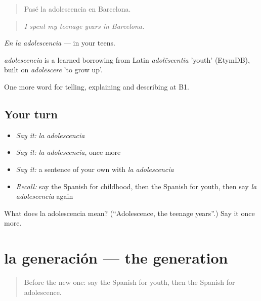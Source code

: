 \begin{quote}
Pasé la adolescencia en Barcelona.
\end{quote}

\begin{quote}
\emph{I spent my teenage years in Barcelona.}
\end{quote}

\emph{En la adolescencia} — in your teens.

\begin{cousinweb}
\emph{adolescencia} is a learned borrowing from Latin \emph{adolēscentia} 'youth' (EtymDB), built on \emph{adolēscere} 'to grow up'.
\end{cousinweb}

\begin{grammarlens}[title={What you've built}]
One more word for telling, explaining and describing at B1.
\end{grammarlens}

\subsection*{Your turn}
\begin{itemize}
\raggedright
  \item \emph{Say it:} \emph{la adolescencia}
  \item \emph{Say it:} \emph{la adolescencia}, once more
  \item \emph{Say it:} a sentence of your own with \emph{la adolescencia}
  \item \emph{Recall:} say the Spanish for childhood, then the Spanish for youth, then say \emph{la adolescencia} again
\end{itemize}

\begin{tcolorbox}[breakable,colback=teal!4,colframe=teal!35!black,title={Before you move on}]
What does la adolescencia mean? (\textquotedblleft{}Adolescence, the teenage years\textquotedblright{}.) Say it once more.
\end{tcolorbox}
\section[la generación]{la generación — the generation}

\label{lesson:ES-C545-generacion}



\begin{quote}
Before the new one: say the Spanish for youth, then the Spanish for adolescence.
\end{quote}

